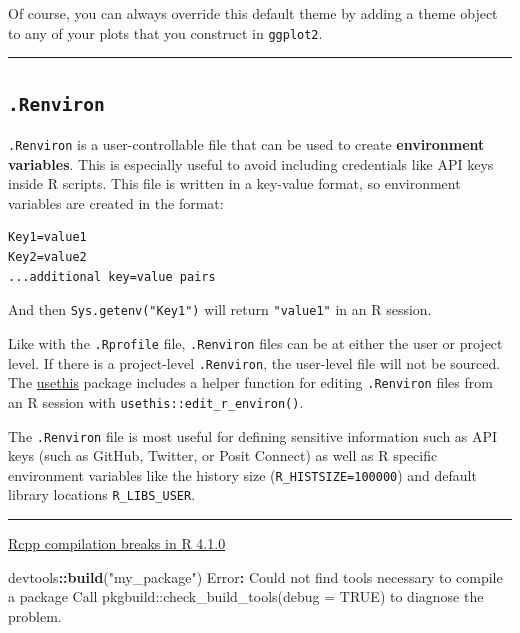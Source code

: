 \documentclass[
  a4paper,
  twoside,
  openright]{book}
\newenvironment{Shaded}{\begin{snugshade}}{\end{snugshade}}
\newcommand{\AttributeTok}[1]{\textcolor[rgb]{0.13,0.29,0.53}{#1}}
\newcommand{\FunctionTok}[1]{\textcolor[rgb]{0.13,0.29,0.53}{\textbf{#1}}}
\newcommand{\NormalTok}[1]{#1}
\newcommand{\SpecialCharTok}[1]{\textcolor[rgb]{0.81,0.36,0.00}{\textbf{#1}}}
\newcommand{\StringTok}[1]{\textcolor[rgb]{0.31,0.60,0.02}{#1}}
\theoremstyle{definition}
\theoremstyle{definition}
\theoremstyle{definition}
\theoremstyle{definition}
\theoremstyle{remark}
\begin{document}
Of course, you can always override this default theme by adding a theme object to any of your plots that you construct in \texttt{ggplot2}.

\begin{center}\rule{0.5\linewidth}{0.5pt}\end{center}

\subsection{\texorpdfstring{\texttt{.Renviron}}{.Renviron}}\label{renviron}

\texttt{.Renviron} is a user-controllable file that can be used to create {\textbf{environment variables}}. This is especially useful to avoid including credentials like API keys inside R scripts. This file is written in a key-value format, so environment variables are created in the format:

\begin{verbatim}
Key1=value1
Key2=value2
...additional key=value pairs
\end{verbatim}

And then \texttt{Sys.getenv("Key1")} will return \texttt{"value1"} in an R session.

Like with the \texttt{.Rprofile} file, \texttt{.Renviron} files can be at either the user or project level. If there is a project-level \texttt{.Renviron}, the user-level file will not be sourced. The \href{https://usethis.r-lib.org/}{usethis} package includes a helper function for editing \texttt{.Renviron} files from an R session with \texttt{usethis::edit\_r\_environ()}.

The \texttt{.Renviron} file is most useful for defining sensitive information such as API keys (such as GitHub, Twitter, or Posit Connect) as well as R specific environment variables like the history size (\texttt{R\_HISTSIZE=100000}) and default library locations \texttt{R\_LIBS\_USER}.

\begin{center}\rule{0.5\linewidth}{0.5pt}\end{center}

\href{https://community.rstudio.com/t/rcpp-compilation-breaks-in-r-4-1-0-running-on-big-sur-11-4/109744}{Rcpp compilation breaks in R 4.1.0}

\begin{Shaded}
\begin{Highlighting}[]
\NormalTok{devtools}\SpecialCharTok{::}\FunctionTok{build}\NormalTok{(}\StringTok{"my\_package"}\NormalTok{)}
\NormalTok{Error}\SpecialCharTok{:}\NormalTok{ Could not find tools necessary to compile a package}
\NormalTok{Call }\StringTok{\textasciigrave{}}\AttributeTok{pkgbuild::check\_build\_tools(debug = TRUE)}\StringTok{\textasciigrave{}}\NormalTok{ to diagnose the problem.}
\end{Highlighting}
\end{Shaded}
\end{document}
